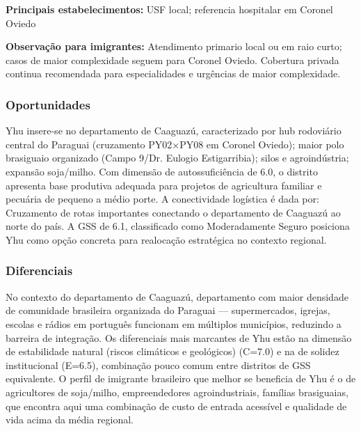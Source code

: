 \textbf{Principais estabelecimentos:} USF local; referencia hospitalar
em Coronel Oviedo

\textbf{Observação para imigrantes:} Atendimento primario local ou em
raio curto; casos de maior complexidade seguem para Coronel Oviedo.
Cobertura privada continua recomendada para especialidades e urgências
de maior complexidade.

\subsubsection*{Oportunidades}\label{oport-yhu-0511}
Yhu insere-se no departamento de Caaguazú, caracterizado por hub rodoviário central do Paraguai (cruzamento PY02×PY08 em Coronel Oviedo); maior polo brasiguaio organizado (Campo 9/Dr. Eulogio Estigarribia); silos e agroindústria; expansão soja/milho. Com dimensão de autossuficiência de 6.0, o distrito apresenta base produtiva adequada para projetos de agricultura familiar e pecuária de pequeno a médio porte. A conectividade logística é dada por: Cruzamento de rotas importantes conectando o departamento de Caaguazú ao norte do país. A GSS de 6.1, classificado como Moderadamente Seguro posiciona Yhu como opção concreta para realocação estratégica no contexto regional.

\subsubsection*{Diferenciais}\label{dif-yhu-0511}
No contexto do departamento de Caaguazú, departamento com maior densidade de comunidade brasileira organizada do Paraguai — supermercados, igrejas, escolas e rádios em português funcionam em múltiplos municípios, reduzindo a barreira de integração. Os diferenciais mais marcantes de Yhu estão na dimensão de estabilidade natural (riscos climáticos e geológicos) (C=7.0) e na de solidez institucional (E=6.5), combinação pouco comum entre distritos de GSS equivalente. O perfil de imigrante brasileiro que melhor se beneficia de Yhu é o de agricultores de soja/milho, empreendedores agroindustriais, famílias brasiguaias, que encontra aqui uma combinação de custo de entrada acessível e qualidade de vida acima da média regional.
